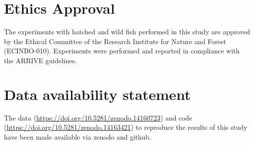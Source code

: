 \documentclass[fleqn,10pt]{wlscirep}
\begin{document}
\section*{Ethics Approval} 
The experiments with hatched and wild fish performed in this study are approved by the Ethical Committee of the Research Institute for Nature and Forest (ECINBO-010). Experiments were performed and reported in compliance with the ARRIVE guidelines.

\section*{Data availability statement}
The data (\href{https://doi.org/10.5281/zenodo.14160723}{https://doi.org/10.5281/zenodo.14160723}) and code (\href{https://doi.org/10.5281/zenodo.14163421}{https://doi.org/10.5281/zenodo.14163421}) to reproduce the results of this study have been made available via zenodo and github.



\end{document}
